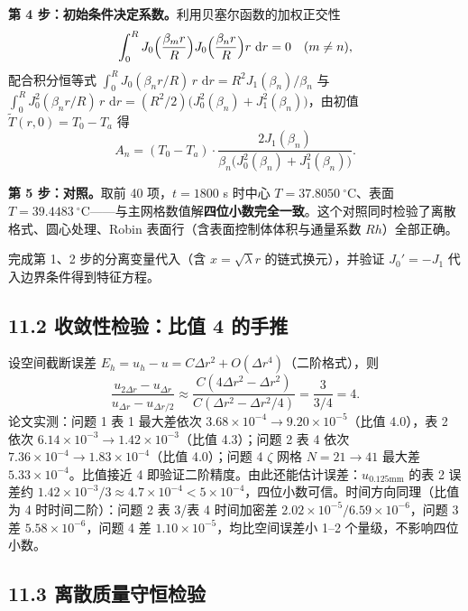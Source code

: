 \documentclass[12pt,a4paper]{ctexart}
\newcommand{\dd}{\,\mathrm{d}}
\newcommand{\handon}[1]{\par\smallskip\noindent{\heiti 【手推练习】}#1\par\smallskip}
\begin{document}
\textbf{第 4 步：初始条件决定系数。}利用贝塞尔函数的加权正交性
\begin{equation}
\int_0^R J_0\Bigl(\frac{\beta_m r}{R}\Bigr)J_0\Bigl(\frac{\beta_n r}{R}\Bigr)r\,\dd r=0\quad(m\neq n),
\end{equation}
配合积分恒等式 $\int_0^R J_0(\beta_n r/R)\,r\,\dd r=R^2J_1(\beta_n)/\beta_n$ 与 $\int_0^R J_0^2(\beta_n r/R)\,r\,\dd r=(R^2/2)\bigl(J_0^2(\beta_n)+J_1^2(\beta_n)\bigr)$，由初值 $\tilde T(r,0)=T_0-T_a$ 得
\begin{equation}
A_n=(T_0-T_a)\cdot\frac{2J_1(\beta_n)}{\beta_n\bigl(J_0^2(\beta_n)+J_1^2(\beta_n)\bigr)}.
\end{equation}

\textbf{第 5 步：对照。}取前 40 项，$t=1800$ s 时中心 $T=37.8050\ ^\circ$C、表面 $T=39.4483\ ^\circ$C——与主网格数值解\textbf{四位小数完全一致}。这个对照同时检验了离散格式、圆心处理、Robin 表面行（含表面控制体体积与通量系数 $R h$）全部正确。

\handon{完成第 1、2 步的分离变量代入（含 $x=\sqrt{\lambda}r$ 的链式换元），并验证 $J_0'=-J_1$ 代入边界条件得到特征方程。}

\subsection{11.2 收敛性检验：比值 4 的手推}

设空间截断误差 $E_h=u_h-u=C\Delta r^2+O(\Delta r^4)$（二阶格式），则
\begin{equation}
\frac{u_{2\Delta r}-u_{\Delta r}}{u_{\Delta r}-u_{\Delta r/2}}
\approx\frac{C(4\Delta r^2-\Delta r^2)}{C(\Delta r^2-\Delta r^2/4)}
=\frac{3}{3/4}=4.
\end{equation}
论文实测：问题 1 表 1 最大差依次 $3.68\times10^{-4}\to9.20\times10^{-5}$（比值 4.0），表 2 依次 $6.14\times10^{-3}\to1.42\times10^{-3}$（比值 4.3）；问题 2 表 4 依次 $7.36\times10^{-4}\to1.83\times10^{-4}$（比值 4.0）；问题 4 $\zeta$ 网格 $N=21\to41$ 最大差 $5.33\times10^{-4}$。比值接近 4 即验证二阶精度。由此还能估计误差：$u_{0.125\mathrm{mm}}$ 的表 2 误差约 $1.42\times10^{-3}/3\approx4.7\times10^{-4}<5\times10^{-4}$，四位小数可信。时间方向同理（比值为 4 时时间二阶）：问题 2 表 3/表 4 时间加密差 $2.02\times10^{-5}/6.59\times10^{-6}$，问题 3 差 $5.58\times10^{-6}$，问题 4 差 $1.10\times10^{-5}$，均比空间误差小 1--2 个量级，不影响四位小数。

\subsection{11.3 离散质量守恒检验}
\end{document}
